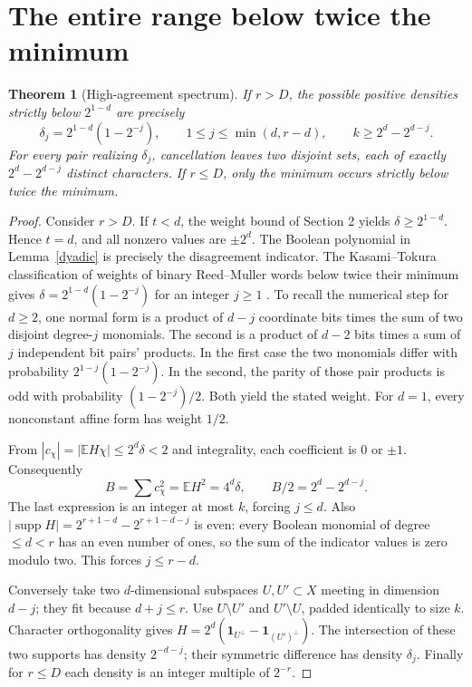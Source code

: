 \documentclass[11pt,letterpaper]{article}
\newtheorem{theorem}{Theorem}
\newcommand{\supp}{\operatorname{supp}}
\newcommand{\one}{\mathbf 1}
\newcommand{\E}{\mathbb E}
\begin{document}
\section{The entire range below twice the minimum}
\begin{theorem}[High-agreement spectrum]\label{spectrum}
If \(r>D\), the possible positive densities strictly below \(2^{1-d}\) are precisely
\[
 \delta_j=2^{1-d}(1-2^{-j}),\qquad
 1\le j\le\min(d,r-d),\qquad k\ge 2^d-2^{d-j}.
\]
For every pair realizing \(\delta_j\), cancellation leaves two disjoint sets, each of exactly \(2^d-2^{d-j}\) distinct characters. If \(r\le D\), only the minimum occurs strictly below twice the minimum.
\end{theorem}
\begin{proof}
Consider \(r>D\). If \(t<d\), the weight bound of Section 2 yields \(\delta\ge2^{1-d}\). Hence \(t=d\), and all nonzero values are \(\pm2^d\). The Boolean polynomial in Lemma~\ref{dyadic} is precisely the disagreement indicator. The Kasami--Tokura classification of weights of binary Reed--Muller words below twice their minimum gives \(\delta=2^{1-d}(1-2^{-j})\) for an integer \(j\ge1\) \cite{KT,GKZ}. To recall the numerical step for \(d\ge2\), one normal form is a product of \(d-j\) coordinate bits times the sum of two disjoint degree-\(j\) monomials. The second is a product of \(d-2\) bits times a sum of \(j\) independent bit pairs' products. In the first case the two monomials differ with probability \(2^{1-j}(1-2^{-j})\). In the second, the parity of those pair products is odd with probability \((1-2^{-j})/2\). Both yield the stated weight. For \(d=1\), every nonconstant affine form has weight \(1/2\).

From \(|c_\chi|=|\E H\chi|\le2^d\delta<2\) and integrality, each coefficient is \(0\) or \(\pm1\). Consequently
\[
 B=\sum c_\chi^2=\E H^2=4^d\delta,\qquad
 B/2=2^d-2^{d-j}.
\]
The last expression is an integer at most \(k\), forcing \(j\le d\). Also \(|\supp H|=2^{r+1-d}-2^{r+1-d-j}\) is even: every Boolean monomial of degree \(\le d<r\) has an even number of ones, so the sum of the indicator values is zero modulo two. This forces \(j\le r-d\).

Conversely take two \(d\)-dimensional subspaces \(U,U'\subset X\) meeting in dimension \(d-j\); they fit because \(d+j\le r\). Use \(U\setminus U'\) and \(U'\setminus U\), padded identically to size \(k\). Character orthogonality gives \(H=2^d(\one_{U^\perp}-\one_{(U')^\perp})\). The intersection of these two supports has density \(2^{-d-j}\); their symmetric difference has density \(\delta_j\). Finally for \(r\le D\) each density is an integer multiple of \(2^{-r}\).
\end{proof}
\end{document}
